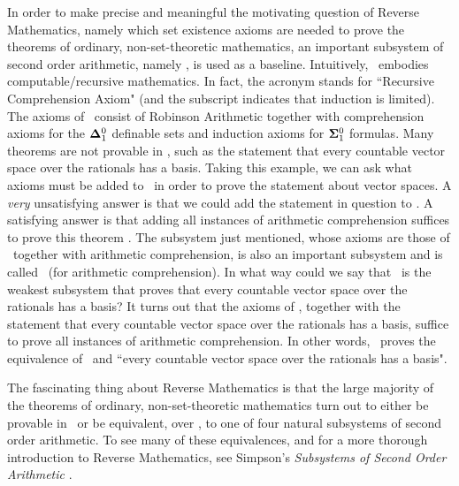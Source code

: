 In order to make precise and meaningful the motivating question of Reverse Mathematics,
namely which set existence axioms are needed to
prove the theorems of ordinary, non-set-theoretic mathematics,
an important subsystem of second order arithmetic,
namely \RCAo, is used as a baseline.
Intuitively, \RCAo\ embodies computable/recursive mathematics.
In fact, the acronym stands for ``Recursive Comprehension Axiom"
(and the subscript indicates that induction is limited).
The axioms of \RCAo\ consist of Robinson Arithmetic together with
comprehension axioms for the $\mathbf{\Delta}^0_1$ definable sets
and induction axioms for $\mathbf{\Sigma}^0_1$ formulas.
Many theorems are not provable in \RCAo,
such as the statement that every countable vector space
over the rationals has a basis.
Taking this example, we can ask what axioms must be added
to \RCAo\ in order to prove the statement about vector spaces.
A \textit{very} unsatisfying answer is that we could
add the statement in question to \RCAo.
A satisfying answer is that adding all instances of arithmetic
comprehension suffices to prove this theorem \cite{SOSOA}.
The subsystem just mentioned, whose axioms are those of \RCAo\ together
with arithmetic comprehension, is also an important subsystem and is
called \ACAo\ (for arithmetic comprehension).
In what way could we say that \ACAo\ is the weakest subsystem that
proves that every countable vector space over the rationals has a basis?
It turns out that the axioms of \RCAo, together with the statement
that every countable vector space over the rationals has a basis,
suffice to prove all instances of arithmetic comprehension.
In other words, \RCAo\ proves the equivalence of \ACAo\ and
``every countable vector space over the rationals has a basis".

The fascinating thing about Reverse Mathematics is that the large
majority of the theorems of ordinary, non-set-theoretic mathematics turn out to
either be provable in \RCAo\ or be equivalent, over \RCAo, to one of
four natural subsystems of second order arithmetic.
To see many of these equivalences, and
for a more thorough introduction to Reverse Mathematics, see Simpson's
\textit{Subsystems of Second Order Arithmetic} \cite{SOSOA}.
